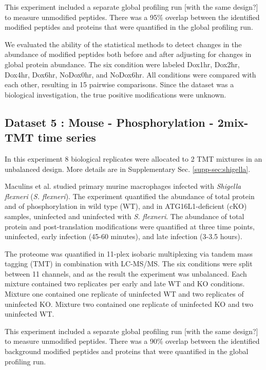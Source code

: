 \documentclass[mcp]{article}
\numberwithin{table}{section}
\def\todo#1{{\color{red}[#1]}}
\begin{document}
\medskip {} This experiment included a separate global profiling run \todo{with the same design?} to measure unmodified peptides. There was a 95\% overlap between the identified modified peptides and proteins that were quantified in the global profiling run.

\medskip {} We evaluated the ability of the statistical methods to detect changes in the abundance of modified peptides both before and after adjusting for changes in global protein abundance. The six condition were labeled Dox1hr, Dox2hr, Dox4hr, Dox6hr, NoDox0hr, and NoDox6hr. All conditions were compared with each other, resulting in 15 pairwise comparisons. Since the dataset was a biological investigation, the true positive modifications were unknown.


\subsection*{Dataset 5 : Mouse - Phosphorylation - 2mix-TMT time series}
\label{sec:exp_proc_dataset5}
In this experiment 8 biological replicates were allocated to 2 TMT mixtures in an unbalanced design. More details are in Supplementary Sec. \ref{supp-sec:shigella}.


\medskip {} Maculins et al. \cite{Maculins} studied primary murine macrophages infected with {\it Shigella flexneri} ({\it S. flexneri}). The experiment quantified the abundance of total protein and of phosphorylation in wild type (WT), and in ATG16L1-deficient (cKO) samples, uninfected and uninfected with {\it S. flexneri}. The abundance of total protein and post-translation modifications were quantified at three time points, uninfected, early infection (45-60 minutes), and late infection (3-3.5 hours). 

The proteome was quantified in 11-plex isobaric multiplexing via tandem mass tagging (TMT) in combination with LC-MS/MS. The six conditions were split between 11 channels, and as the result the experiment was unbalanced. Each mixture contained two replicates per early and late WT and KO conditions. Mixture one contained one replicate of uninfected WT and two replicates of uninfected KO. Mixture two contained one replicate of uninfected KO and two uninfected WT.

\medskip {} This experiment included a separate global profiling run \todo{with the same design?} to measure unmodified peptides. There was a 90\% overlap between the identified background modified peptides and proteins that were quantified in the global profiling run.
\end{document}
